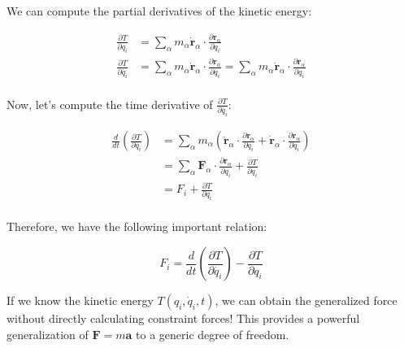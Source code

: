 We can compute the partial derivatives of the kinetic energy:

\begin{align}
    \frac {\partial T}{\partial q_i} &= \sum_\alpha m_\alpha \dot{\mathbf{r}}_\alpha \cdot \frac{\partial \dot{\mathbf{r}}_\alpha}{\partial q_i} \\
    \frac {\partial T}{\partial \dot{q_i}} &= \sum_\alpha m_\alpha \dot{\mathbf{r}}_\alpha \cdot \frac{\partial \dot{\mathbf{r}}_\alpha}{\partial \dot{q_i}} = \sum_\alpha m_\alpha \dot{\mathbf{r}}_\alpha \cdot \frac{\partial \mathbf{r}_\alpha}{\partial q_i}\\
\end{align}

Now, let's compute the time derivative of $\frac {\partial T}{\partial \dot{q_i}}$:

\begin{align}
    \frac{d}{dt} \left(\frac {\partial T}{\partial \dot{q_i}}\right) &= \sum_\alpha m_\alpha \left(\ddot{\mathbf{r}}_\alpha \cdot \frac{\partial \mathbf{r}_\alpha}{\partial q_i} + \dot{\mathbf{r}}_\alpha \cdot \frac{\partial \dot{\mathbf{r}}_\alpha}{\partial q_i}\right) \\
    &= \sum_\alpha \mathbf{F}_\alpha \cdot \frac{\partial \mathbf{r}_\alpha}{\partial q_i} + \frac{\partial T}{\partial q_i} \\
    &= F_i + \frac{\partial T}{\partial q_i} \\
\end{align}

Therefore, we have the following important relation:

\begin{equation}
    F_i = \frac{d}{dt} \left(\frac {\partial T}{\partial \dot{q_i}}\right) - \frac{\partial T}{\partial q_i}
\end{equation}

If we know the kinetic energy $T(q_i, \dot{q}_i, t)$, we can obtain the generalized force 
without directly calculating constraint forces! This provides a powerful generalization 
of $\mathbf{F} = m\mathbf{a}$ to a generic degree of freedom.